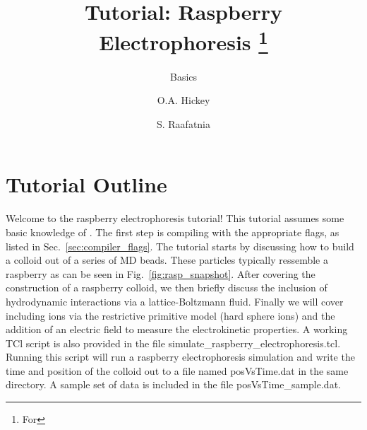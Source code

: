 \documentclass[
paper=a4,                       %
fontsize=11pt,                  %
twoside,                        %
footsepline,                    %
headsepline,                    %
headinclude=false,              %
footinclude=false,              %
pagesize,                       %
]{scrartcl}
\begin{document}
\title{Tutorial: Raspberry Electrophoresis%
\ifdefined\esversion%
\thanks{For \es \esversion}%
\fi%
}
\subtitle{\es Basics}
\author{O.A. Hickey \and S. Raafatnia}
\maketitle


\section{Tutorial Outline}

Welcome to the raspberry electrophoresis \es{} tutorial! This tutorial assumes some basic knowledge of \es{}.
The first step is compiling \es{} with the appropriate flags, as listed in Sec.~\ref{sec:compiler_flags}.
The tutorial starts by discussing how to build a colloid out of a series of MD beads. These particles typically
ressemble a raspberry as can be seen in Fig.~\ref{fig:rasp_snapshot}. After covering the construction of a raspberry colloid, we then
briefly discuss the inclusion of hydrodynamic interactions via a lattice-Boltzmann fluid. Finally we will cover
including ions via the restrictive primitive model (hard sphere ions) and the addition of an electric field
to measure the electrokinetic properties. A working TCl script is also provided in the file simulate\_raspberry\_electrophoresis.tcl. Running
this script will run a raspberry electrophoresis simulation and write the time and position of the colloid out to a file named posVsTime.dat in the same directory.
A sample set of data is included in the file posVsTime\_sample.dat.
\end{document}
